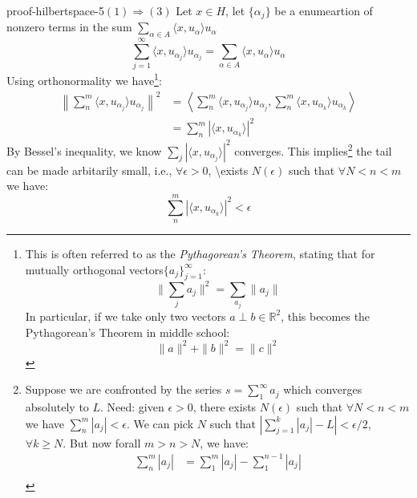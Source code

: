 \begin{mystthmproof}{}{proof-hilbertspace-5}$(1)\Longrightarrow (3)$ Let $x\in H$, let $\{\alpha_j\}$ be a enumeartion of nonzero terms in the sum $\sum_{\alpha \in A} \langle x, u_{\alpha} \rangle u_{\alpha}$
\begin{equation}
\sum_{j=1}^{\infty} \langle x, u_{\alpha_j}\rangle u_{\alpha_j}=\sum_{\alpha \in A} \langle x, u_{\alpha}\rangle u_{\alpha}
\end{equation}
Using orthonormality we have\footnote{This is often referred to as the \textit{Pythagorean's Theorem}, stating that for mutually orthogonal vectors$\{a_j\}_{j=1}^{\infty}$:
\begin{equation}
\|\sum_j a_j\|^2 = \sum_{a_j}\|a_j\|
\end{equation}
In particular, if we take only two vectors $a \perp b \in \mathbb{R}^2$, this becomes the Pythagorean's Theorem in middle school:
\begin{equation}
\|a\|^2 + \|b\|^2 = \|c\|^2
\end{equation}}:
\begin{equation}
\begin{aligned}
\left \| \sum_{n}^m \langle x, u_{\alpha_j} \rangle u_{\alpha_j} \right \|^2 &= \left\langle \sum_{n}^m  \langle x, u_{\alpha_j} \rangle u_{\alpha_j}, \sum_{n}^m  \langle x, u_{\alpha_k} \rangle u_{\alpha_k} \right\rangle  \\
&= \sum_{n}^m \left| \langle x, u_{\alpha_k} \rangle \right|^2
\end{aligned}
\end{equation}
By Bessel's inequality, we know $\sum_{j}\left| \langle x, u_{\alpha_j} \rangle \right|^2$ converges. This implies\footnote{Suppose we are confronted by the series  $s=\sum_{1}^{\infty}a_j$ which converges absolutely to $L$.
Need: given $\epsilon>0$, there exists $N(\epsilon)$ such that $\forall N<n<m$ we have $\sum_{n}^m |a_j| < \epsilon$.
We can pick $N$ such that $\left|\sum_{j=1}^k |a_j| -L\right| < \epsilon/2$, $\forall k\geq N$. But now forall $m>n>N$, we have:
\begin{equation}
\begin{aligned}
\sum_{n}^m |a_j| &= \sum_{1}^m |a_j| - \sum_1^{n-1} |a_j|   \\
\end{aligned}
\end{equation}} the tail can be made arbitarily small, i.e., $\forall \epsilon >0$, {\textbackslash}exists $N(\epsilon)$ such that $\forall N<n<m$ we have:
\begin{equation}
\sum_{n}^m \left| \langle x, u_{\alpha_k} \rangle \right|^2  < \epsilon
\end{equation}

\end{mystthmproof}
